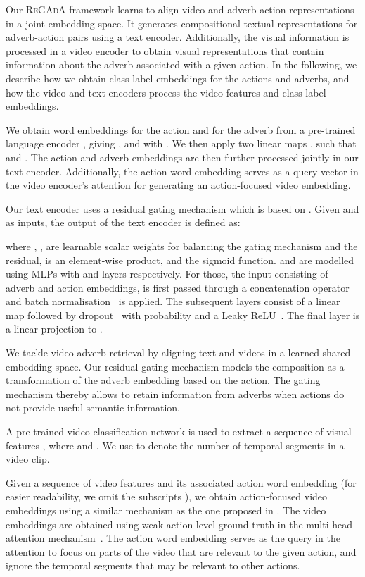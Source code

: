 \documentclass[table]{bmvc2k}
\newcommand{\modelName}{\textsc{ReGAdA}\xspace}
\begin{document}
Our \modelName framework learns to align video and adverb-action representations in a joint embedding space. It generates compositional textual representations for adverb-action pairs using a text encoder. Additionally, the visual information is processed in a video encoder to obtain visual representations that contain information about the adverb associated with a given action.
In the following, we describe how we obtain class label embeddings for the actions and adverbs, and how the video and text encoders process the video features and class label embeddings. 

We obtain word embeddings for the action  and for the adverb  from a pre-trained language encoder , giving , and  with .
We then apply two linear maps , such that  and .
The action and adverb embeddings are then further processed jointly in our text encoder. Additionally, the action word embedding  serves as a query vector in the video encoder's attention for generating an action-focused video embedding.

Our text encoder uses a residual gating mechanism which is based on \cite{vo2019composing}. Given  and  as inputs, the output of the text encoder is defined as:

where , ,  are learnable scalar weights for balancing the gating mechanism and the residual,  is an element-wise product, and  the sigmoid function.
 and  are modelled using MLPs with  and  layers respectively. For those, the input consisting of adverb and action embeddings, is first passed through a concatenation operator and batch normalisation~\cite{ioffe2015batch} is applied. The subsequent layers consist of a linear map followed by dropout~\cite{srivastava2014dropout} with probability  and a Leaky ReLU~\cite{xu2015empirical}.
The final layer is a linear projection to .

We tackle video-adverb retrieval by aligning text and videos in a learned shared embedding space. Our residual gating mechanism models the composition as a transformation of the adverb embedding based on the action. The gating mechanism thereby allows to retain information from adverbs when actions do not provide useful semantic information. 


A pre-trained video classification network  is used to extract a sequence of visual features , where  and . We use  to denote the number of temporal segments in a video clip.

Given a sequence of video features  and its associated action word embedding  (for easier readability, we omit the subscripts ), we obtain action-focused video embeddings using a similar mechanism as the one proposed in \cite{doughty_action_2020}. 
The video embeddings are obtained using weak action-level ground-truth in the multi-head attention mechanism~\cite{vaswani2017attention}. The action word embedding  serves as the query in the attention to focus on parts of the video that are relevant to the given action, and ignore the temporal segments that may be relevant to other actions.
\end{document}
